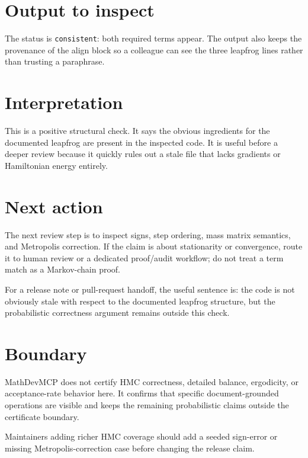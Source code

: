 \documentclass[12pt,a4paper,openany]{book}
\begin{document}


\section*{Output to inspect}

The status is \texttt{consistent}: both required terms appear. The output also keeps
the provenance of the align block so a colleague can see the three leapfrog
lines rather than trusting a paraphrase.

\section*{Interpretation}

This is a positive structural check. It says the obvious ingredients for the
documented leapfrog are present in the inspected code. It is useful before a
deeper review because it quickly rules out a stale file that lacks gradients or
Hamiltonian energy entirely.

\section*{Next action}

The next review step is to inspect signs, step ordering, mass matrix semantics,
and Metropolis correction. If the claim is about stationarity or convergence,
route it to human review or a dedicated proof/audit workflow; do not treat a
term match as a Markov-chain proof.

For a release note or pull-request handoff, the useful sentence is: the code is
not obviously stale with respect to the documented leapfrog structure, but the
probabilistic correctness argument remains outside this check.

\section*{Boundary}

MathDevMCP does not certify HMC correctness, detailed balance, ergodicity, or
acceptance-rate behavior here. It confirms that specific document-grounded
operations are visible and keeps the remaining probabilistic claims outside the
certificate boundary.

Maintainers adding richer HMC coverage should add a seeded sign-error or missing
Metropolis-correction case before changing the release claim.
\end{document}
